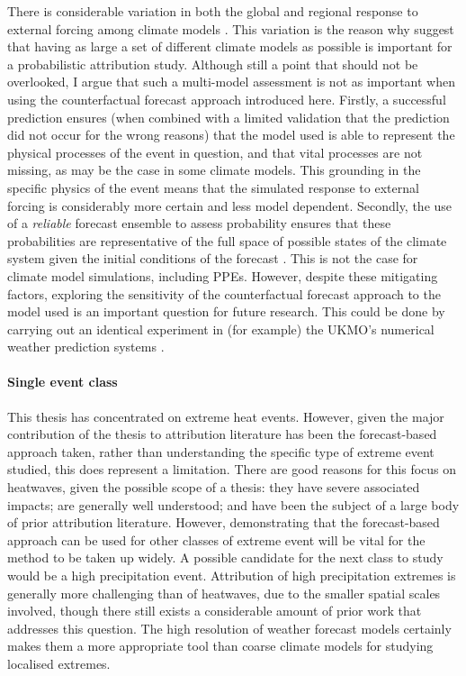     There is considerable variation in both the global and regional response to external forcing among climate models \cite{meehl_context_2020,seneviratne_regional_2020,masson-delmotte_human_2021,masson-delmotte_earths_2021,masson-delmotte_linking_2021,masson-delmotte_weather_2021}. This variation is the reason why \citet{philip_protocol_2020} suggest that having as large a set of different climate models as possible is important for a probabilistic attribution study. Although still a point that should not be overlooked, I argue that such a multi-model assessment is not as important when using the counterfactual forecast approach introduced here. Firstly, a successful prediction ensures (when combined with a limited validation that the prediction did not occur for the wrong reasons) that the model used is able to represent the physical processes of the event in question, and that vital processes are not missing, as may be the case in some climate models. This grounding in the specific physics of the event means that the simulated response to external forcing is considerably more certain and less model dependent. Secondly, the use of a \emph{reliable} forecast ensemble to assess probability ensures that these probabilities are representative of the full space of possible states of the climate system given the initial conditions of the forecast \citep{murphy_new_1973}. This is not the case for climate model simulations, including PPEs. However, despite these mitigating factors, exploring the sensitivity of the counterfactual forecast approach to the model used is an important question for future research. This could be done by carrying out an identical experiment in (for example) the UKMO's numerical weather prediction systems \citep{walters_met_2017,maclachlan_global_2015}.

  \paragraph*{Single event class}

    This thesis has concentrated on extreme heat events. However, given the major contribution of the thesis to attribution literature has been the forecast-based approach taken, rather than understanding the specific type of extreme event studied, this does represent a limitation. There are good reasons for this focus on heatwaves, given the possible scope of a thesis: they have severe associated impacts; are generally well understood; and have been the subject of a large body of prior attribution literature. However, demonstrating that the forecast-based approach can be used for other classes of extreme event will be vital for the method to be taken up widely. A possible candidate for the next class to study would be a high precipitation event. Attribution of high precipitation extremes is generally more challenging than of heatwaves, due to the smaller spatial scales involved, though there still exists a considerable amount of prior work that addresses this question. The high resolution of weather forecast models certainly makes them a more appropriate tool than coarse climate models for studying localised extremes.

